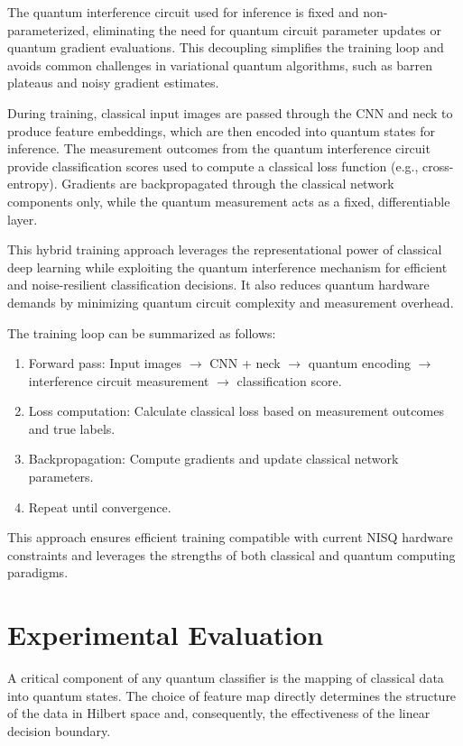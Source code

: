 \documentclass[conference]{IEEEtran}
\begin{document}
The quantum interference circuit used for inference is fixed and non-parameterized, eliminating the need for quantum circuit parameter updates or quantum gradient evaluations. This decoupling simplifies the training loop and avoids common challenges in variational quantum algorithms, such as barren plateaus and noisy gradient estimates.

During training, classical input images are passed through the CNN and neck to produce feature embeddings, which are then encoded into quantum states for inference. The measurement outcomes from the quantum interference circuit provide classification scores used to compute a classical loss function (e.g., cross-entropy). Gradients are backpropagated through the classical network components only, while the quantum measurement acts as a fixed, differentiable layer.

This hybrid training approach leverages the representational power of classical deep learning while exploiting the quantum interference mechanism for efficient and noise-resilient classification decisions. It also reduces quantum hardware demands by minimizing quantum circuit complexity and measurement overhead.

The training loop can be summarized as follows:

\begin{enumerate}
    \item Forward pass: Input images $\rightarrow$ CNN + neck $\rightarrow$ quantum encoding $\rightarrow$ interference circuit measurement $\rightarrow$ classification score.
    \item Loss computation: Calculate classical loss based on measurement outcomes and true labels.
    \item Backpropagation: Compute gradients and update classical network parameters.
    \item Repeat until convergence.
\end{enumerate}

This approach ensures efficient training compatible with current NISQ hardware constraints and leverages the strengths of both classical and quantum computing paradigms.


\section{Experimental Evaluation}

A critical component of any quantum classifier is the mapping of classical data into quantum states. The choice of feature map directly determines the structure of the data in Hilbert space and, consequently, the effectiveness of the linear decision boundary.
\end{document}
